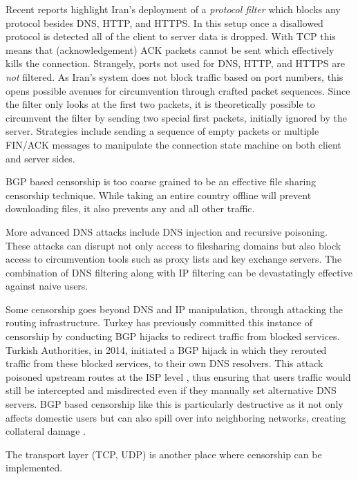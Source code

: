 Recent reports highlight Iran's deployment of a \emph{protocol filter} which blocks any
protocol besides DNS, HTTP, and HTTPS.
\cite{bockDetectingEvadingCensorshipDepth} In this setup once a disallowed
protocol is detected all of the client to server data is dropped. With TCP this
means that (acknowledgement) ACK packets cannot be sent which effectively kills the connection.
\cite[\S 4.1]{bockDetectingEvadingCensorshipDepth} Strangely, ports not used for
DNS, HTTP, and HTTPS are \emph{not} filtered. As Iran’s system does not block traffic based on port
numbers, this opens possible avenues for circumvention through crafted packet sequences.
Since the filter only looks at the first two packets, it is theoretically possible to
circumvent the filter by sending two special first packets, initially ignored by the
server. Strategies include sending a sequence of empty packets or multiple FIN/ACK messages
to manipulate the connection state machine on both client and server sides.

BGP based censorship is too coarse grained to be an effective file sharing
censorship technique. While taking an entire country offline will prevent
downloading files, it also prevents any and all other traffic.\cite[p.\@
      5]{wendzelSurveyInternetCensorship2025}

More advanced DNS attacks include DNS injection and recursive poisoning. These attacks can disrupt
not only access to filesharing domains but also block access to circumvention tools such as proxy
lists and key exchange servers. The combination of DNS filtering along with IP filtering can be
devastatingly effective against naive users.

Some censorship goes beyond DNS and IP manipulation, through attacking the
routing infrastructure. Turkey has previously committed this instance of
censorship by conducting BGP hijacks to redirect traffic from blocked services.
Turkish Authorities, in 2014, initiated a BGP hijack in which they rerouted
traffic from these blocked services, to their own DNS resolvers. This attack
poisoned upstream routes at the ISP level \cite{internetsociety2014_hijack},
thus ensuring that users traffic would still be intercepted and misdirected even
if they manually set alternative DNS servers. BGP based censorship like this is
particularly destructive as it not only affects domestic users but can also
spill over into neighboring networks, creating collateral damage
\cite{chung2017dnssec}.

The transport layer (TCP, UDP) is another place where censorship can be
implemented.\cite[p.\@ 5]{wendzelSurveyInternetCensorship2025}

